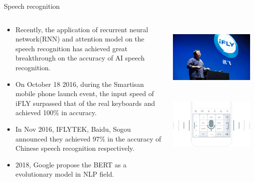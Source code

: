 \documentclass{beamer}
\begin{document}
\begin{CJK*}{UTF8}{gbsn}
\begin{frame}{Speech recognition}
\begin{columns}
\begin{column}{0.6\textwidth}
\begin{itemize}
\item Recently, the application of recurrent neural network(RNN) and attention model on the speech recognition has achieved great breakthrough on the accuracy of AI speech recognition.

\item On October 18 2016, during the Smartisan mobile phone launch event, the input speed of iFLY surpassed that of the real keyboards and achieved 100\% in accuracy.

\item In Nov 2016, IFLYTEK, Baidu, Sogou announced they achieved 97\% in the accuracy of Chinese speech recognition respectively.


\item 2018, Google propose the BERT as a evolutionary model in NLP field.
\end{itemize}
\end{column}

\begin{column}{0.4\textwidth}
\centering  
\includegraphics[width=\textwidth]{figures/SpeechRecognition1}  \\
\centering  
\includegraphics[width=\textwidth]{figures/SpeechRecognition2}  
\end{column}
\end{columns}
\end{frame}



\end{CJK*}
\end{document}

